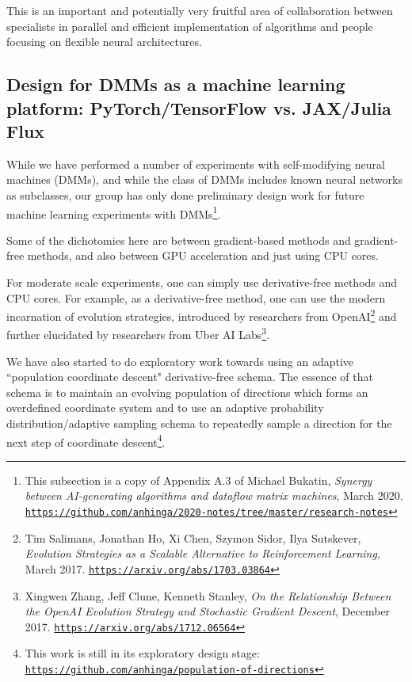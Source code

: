 \documentclass{article}
\begin{document}
This is an important and potentially very fruitful area of collaboration between specialists in parallel and efficient implementation
of algorithms and people focusing on flexible neural architectures.

\subsection{Design for DMMs as a machine learning platform: PyTorch/TensorFlow vs. JAX/Julia Flux}

While we have performed a number of experiments with self-modifying neural machines (DMMs),
and while the class of DMMs includes known neural networks as subclasses,
our group has only done preliminary design work for future machine learning experiments with DMMs\footnote{This subsection
is a copy of Appendix A.3 of Michael Bukatin, {\em Synergy between AI-generating algorithms and dataflow matrix machines},
March 2020.
\href{https://github.com/anhinga/2020-notes/tree/master/research-notes}
{\tt https://github.com/anhinga/2020-notes/tree/master/research-notes}}.

Some of the dichotomies here are between gradient-based methods and gradient-free methods,
and also between GPU acceleration and just using CPU cores.

For moderate scale experiments, one can simply use derivative-free methods and CPU cores.
For example, as a derivative-free method, one can use the modern incarnation of evolution strategies, introduced by researchers from OpenAI\footnote{Tim Salimans, Jonathan Ho, Xi Chen, Szymon Sidor, Ilya Sutskever, {\em Evolution Strategies as a Scalable Alternative to Reinforcement Learning}, March 2017.
\href{https://arxiv.org/abs/1703.03864}{\tt https://arxiv.org/abs/1703.03864}}  and
further elucidated by researchers from Uber AI Labs\footnote{Xingwen Zhang, Jeff Clune, Kenneth Stanley,
{\em On the Relationship Between the OpenAI Evolution Strategy and Stochastic Gradient Descent}, December 2017.
\href{https://arxiv.org/abs/1712.06564}{\tt https://arxiv.org/abs/1712.06564}}. 

We have also started to do
exploratory work towards using an adaptive ``population coordinate descent" derivative-free schema. The essence of
that schema is to maintain an evolving
population of directions which forms an overdefined coordinate system and to use an adaptive probability distribution/adaptive
sampling schema to repeatedly sample a direction for the next step of coordinate descent\footnote{This work is
still in its exploratory design stage: 
\href{https://github.com/anhinga/population-of-directions}{\tt https://github.com/anhinga/population-of-directions}}.
\end{document}
